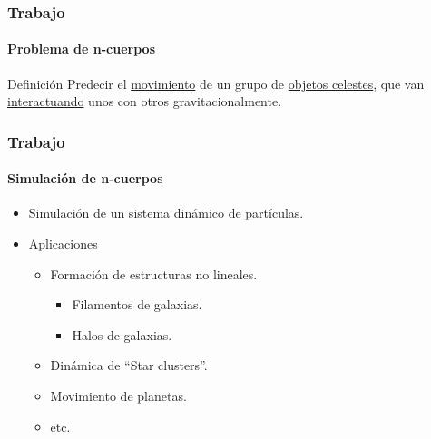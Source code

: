 \frame
{
\frametitle{Trabajo}
\framesubtitle{Problema de n-cuerpos}
\begin{block}{Definición}
    Predecir el \underline{movimiento} de un grupo de \underline{objetos celestes},
    que van \underline{interactuando} unos con otros gravitacionalmente.
\end{block}
}

\frame
{
\frametitle{Trabajo}
\framesubtitle{Simulación de n-cuerpos}
\begin{itemize}
    \item Simulación de un sistema dinámico de partículas.
    \item Aplicaciones
    \begin{itemize}
        \item Formación de estructuras no lineales.
        \begin{itemize}
            \item Filamentos de galaxias.
            \item Halos de galaxias.
        \end{itemize}
        \item Dinámica de ``Star clusters''.
        \item Movimiento de planetas.
        \item etc.
    \end{itemize}
\end{itemize}
}


